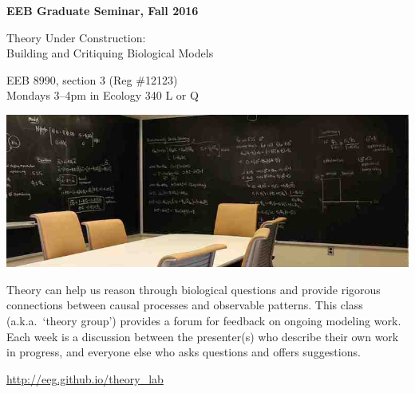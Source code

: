 \documentclass[17pt]{extarticle}
\begin{document}
\begin{center}
{\large {\bf
    EEB Graduate Seminar, Fall 2016

    Theory Under Construction: \\ Building and Critiquing Biological Models
}}
\end{center}

EEB 8990, section 3 (Reg \#12123) \\
Mondays 3--4pm in Ecology 340 L or Q

\vfill
\includegraphics[width=\textwidth]{../images/chalkboards.jpg}

\vfill

Theory can help us reason through biological questions and provide rigorous connections between causal processes and observable patterns.
This class (a.k.a.\ `theory group') provides a forum for feedback on ongoing modeling work.
Each week is a discussion between the presenter(s) who describe their own work in progress, and everyone else who asks questions and offers suggestions.

\hfill \url{http://eeg.github.io/theory_lab}

\vfill
\end{document}
